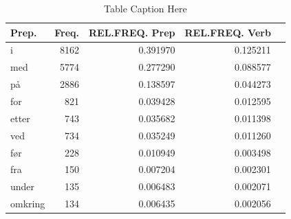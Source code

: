 \documentclass{article}
\begin{document}
\begin{table}[h!]
    \centering
    \begin{tabular}{lrrrr}
        \toprule
        \midrule
     Prep.   & Freq. & REL.FREQ. Prep & REL.FREQ. Verb \\
     \hline
     i       & 8162 & 0.391970 & 0.125211 \\
     med     & 5774 & 0.277290 & 0.088577 \\
     på      & 2886 & 0.138597 & 0.044273 \\
     for     & 821 & 0.039428 & 0.012595 \\
     etter   & 743 & 0.035682 & 0.011398 \\
     ved     & 734 & 0.035249 & 0.011260 \\
     før     & 228 & 0.010949 & 0.003498 \\
     fra     & 150 & 0.007204 & 0.002301 \\
     under   & 135 & 0.006483 & 0.002071 \\
     omkring & 134 & 0.006435 & 0.002056 \\     
                    
        \bottomrule
    \end{tabular}
    \caption{Table Caption Here}
    \label{tab:prep_begynne}
\end{table}






\end{document}
